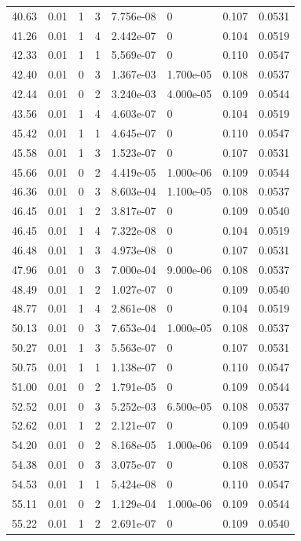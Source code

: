 \documentclass[preview]{standalone}
\begin{document}
{{{\begin{tabular}{L{1.2cm}C{1.2cm} C{0.3cm}C{0.5cm} C{1.4cm}C{1.4cm} C{1.4cm}C{1.4cm}}
  40.63  &  0.01  & 1     &  3 &  7.756e-08  & 0  & 0.107 &  0.0531   \\ 
  41.26  &  0.01  & 1     &  4 &  2.442e-07  & 0  & 0.104 &  0.0519   \\ 
  42.33  &  0.01  & 1     &  1 &  5.569e-07  & 0  & 0.110 &  0.0547   \\ 
  42.40  &  0.01  & 0     &  3 &  1.367e-03  & 1.700e-05  & 0.108 &  0.0537   \\ 
  42.44  &  0.01  & 0     &  2 &  3.240e-03  & 4.000e-05  & 0.109 &  0.0544   \\ 
  43.56  &  0.01  & 1     &  4 &  4.603e-07  & 0  & 0.104 &  0.0519   \\ 
  45.42  &  0.01  & 1     &  1 &  4.645e-07  & 0  & 0.110 &  0.0547   \\ 
  45.58  &  0.01  & 1     &  3 &  1.523e-07  & 0  & 0.107 &  0.0531   \\ 
  45.66  &  0.01  & 0     &  2 &  4.419e-05  & 1.000e-06  & 0.109 &  0.0544   \\ 
  46.36  &  0.01  & 0     &  3 &  8.603e-04  & 1.100e-05  & 0.108 &  0.0537   \\ 
  46.45  &  0.01  & 1     &  2 &  3.817e-07  & 0  & 0.109 &  0.0540   \\ 
  46.45  &  0.01  & 1     &  4 &  7.322e-08  & 0  & 0.104 &  0.0519   \\ 
  46.48  &  0.01  & 1     &  3 &  4.973e-08  & 0  & 0.107 &  0.0531   \\ 
  47.96  &  0.01  & 0     &  3 &  7.000e-04  & 9.000e-06  & 0.108 &  0.0537   \\ 
  48.49  &  0.01  & 1     &  2 &  1.027e-07  & 0  & 0.109 &  0.0540   \\ 
  48.77  &  0.01  & 1     &  4 &  2.861e-08  & 0  & 0.104 &  0.0519   \\ 
  50.13  &  0.01  & 0     &  3 &  7.653e-04  & 1.000e-05  & 0.108 &  0.0537   \\ 
  50.27  &  0.01  & 1     &  3 &  5.563e-07  & 0  & 0.107 &  0.0531   \\ 
  50.75  &  0.01  & 1     &  1 &  1.138e-07  & 0  & 0.110 &  0.0547   \\ 
  51.00  &  0.01  & 0     &  2 &  1.791e-05  & 0  & 0.109 &  0.0544   \\ 
  52.52  &  0.01  & 0     &  3 &  5.252e-03  & 6.500e-05  & 0.108 &  0.0537   \\ 
  52.62  &  0.01  & 1     &  2 &  2.121e-07  & 0  & 0.109 &  0.0540   \\ 
  54.20  &  0.01  & 0     &  2 &  8.168e-05  & 1.000e-06  & 0.109 &  0.0544   \\ 
  54.38  &  0.01  & 0     &  3 &  3.075e-07  & 0  & 0.108 &  0.0537   \\ 
  54.53  &  0.01  & 1     &  1 &  5.424e-08  & 0  & 0.110 &  0.0547   \\ 
  55.11  &  0.01  & 0     &  2 &  1.129e-04  & 1.000e-06  & 0.109 &  0.0544   \\ 
  55.22  &  0.01  & 1     &  2 &  2.691e-07  & 0  & 0.109 &  0.0540   \\ 
\hline 
\end{tabular} 

}}}
\end{document}
